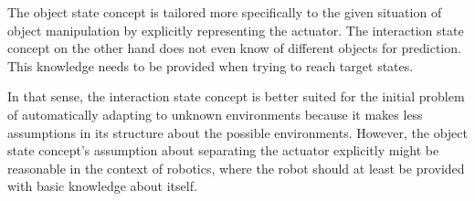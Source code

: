 The object state concept is tailored more specifically to the given situation of object manipulation by explicitly representing the actuator. The interaction state concept on the other hand does not even know of different objects for prediction. This knowledge needs to be provided when trying to reach target states.

In that sense, the interaction state concept is better suited for the initial problem of automatically adapting to unknown environments because it makes less assumptions in its structure about the possible environments. 
However, the object state concept's assumption about separating the actuator explicitly might be reasonable in the context of robotics, where the robot should at least be provided with basic knowledge about itself. 




